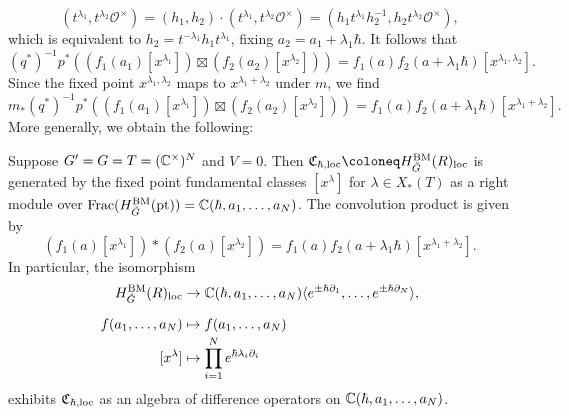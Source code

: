 \begin{example}
	\begin{equation}
		(t^{\lambda_1},t^{\lambda_2} \mathcal{O}^\times) = (h_1,h_2) \cdot (t^{\lambda_1},t^{\lambda_2} \mathcal{O}^\times) = (h_1 t^{\lambda_1} h_2^{-1}, h_2 t^{\lambda_2} \mathcal{O}^\times),
	\end{equation}
	which is equivalent to $h_2 = t^{-\lambda_1} h_1 t^{\lambda_1}$, fixing $a_2 = a_1 + \lambda_1 \hbar$. It follows that
	\begin{equation}
		(q^*)^{-1} p^*((f_1(a_1) [x^{\lambda_1}]) \boxtimes (f_2(a_2) [x^{\lambda_2}])) = f_1(a) f_2(a+\lambda_1\hbar) [x^{\lambda_1,\lambda_2}].
	\end{equation}
	Since the fixed point $x^{\lambda_1,\lambda_2}$ maps to $x^{\lambda_1+\lambda_2}$ under $m$, we find
	\begin{equation}
		m_* (q^*)^{-1} p^*((f_1(a_1) [x^{\lambda_1}]) \boxtimes (f_2(a_2) [x^{\lambda_2}])) = f_1(a) f_2(a+\lambda_1\hbar) [x^{\lambda_1+\lambda_2}].
	\end{equation}
	More generally, we obtain the following:
\end{example}

\begin{prop}
	Suppose $G' = G = T = (\mathbb{C}^\times)^N$ and $V=0$. Then $\mathfrak{C}_{\hbar,\textup{loc}} \coloneq H_{\tilde G}^\textup{BM}(R)_\textup{loc}$ is generated by the fixed point fundamental classes $[x^\lambda]$ for $\lambda \in X_*(T)$ as a right module over $\operatorname{Frac}(H_{\tilde G}^\textup{BM}(\text{pt})) = \mathbb{C}(\hbar,a_1,\dots,a_N)$. The convolution product is given by
	\begin{equation}
		(f_1(a) [x^{\lambda_1}]) * (f_2(a) [x^{\lambda_2}]) = f_1(a) f_2(a+\lambda_1 \hbar) [x^{\lambda_1 + \lambda_2}].
	\end{equation}
	In particular, the isomorphism
	\begin{align}
		H_{\tilde G}^\textup{BM}(R)_\textup{loc} &\to \mathbb{C}(\hbar,a_1,\dots,a_N)\langle e^{\pm\hbar\partial_1},\dots,e^{\pm\hbar\partial_N} \rangle, \\[6pt]
		f(a_1,\dots,a_N) &\mapsto f(a_1,\dots,a_N) \\[-2pt]
		[x^\lambda] &\mapsto \prod_{i=1}^N e^{\hbar \lambda_i \partial_i}
	\end{align}
	exhibits $\mathfrak{C}_{\hbar,\textup{loc}}$ as an algebra of difference operators on $\mathbb{C}(\hbar,a_1,\dots,a_N)$.
\end{prop}

